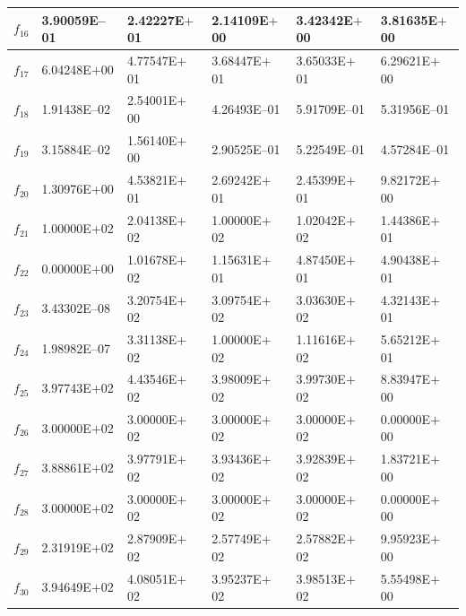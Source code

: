 \documentclass{svproc}
\begin{document}
\begin{table}
{\begin{tabular}{p{1cm}p{2.5cm}p{2.5cm}p{2.5cm}p{2.5cm}p{2.5cm}}
		$f_{16}$ & 3.90059E--01 & 2.42227E$+$01 & 2.14109E$+$00 & 3.42342E$+$00 & 3.81635E$+$00 \\ \hline
		$f_{17}$ & 6.04248E$+$00 & 4.77547E$+$01 & 3.68447E$+$01 & 3.65033E$+$01 & 6.29621E$+$00 \\ \hline
		$f_{18}$ & 1.91438E--02 & 2.54001E$+$00 & 4.26493E--01 & 5.91709E--01 & 5.31956E--01 \\ \hline
		$f_{19}$ & 3.15884E--02 & 1.56140E$+$00 & 2.90525E--01 & 5.22549E--01 & 4.57284E--01 \\ \hline
		$f_{20}$ & 1.30976E$+$00 & 4.53821E$+$01 & 2.69242E$+$01 & 2.45399E$+$01 & 9.82172E$+$00 \\ \hline
		$f_{21}$ & 1.00000E$+$02 & 2.04138E$+$02 & 1.00000E$+$02 & 1.02042E$+$02 & 1.44386E$+$01 \\ \hline
		$f_{22}$ & 0.00000E$+$00 & 1.01678E$+$02 & 1.15631E$+$01 & 4.87450E$+$01 & 4.90438E$+$01 \\ \hline
		$f_{23}$ & 3.43302E--08 & 3.20754E$+$02 & 3.09754E$+$02 & 3.03630E$+$02 & 4.32143E$+$01 \\ \hline
		$f_{24}$ & 1.98982E--07 & 3.31138E$+$02 & 1.00000E$+$02 & 1.11616E$+$02 & 5.65212E$+$01 \\ \hline
		$f_{25}$ & 3.97743E$+$02 & 4.43546E$+$02 & 3.98009E$+$02 & 3.99730E$+$02 & 8.83947E$+$00 \\ \hline
		$f_{26}$ & 3.00000E$+$02 & 3.00000E$+$02 & 3.00000E$+$02 & 3.00000E$+$02 & 0.00000E$+$00 \\ \hline
		$f_{27}$ & 3.88861E$+$02 & 3.97791E$+$02 & 3.93436E$+$02 & 3.92839E$+$02 & 1.83721E$+$00 \\ \hline
		$f_{28}$ & 3.00000E$+$02 & 3.00000E$+$02 & 3.00000E$+$02 & 3.00000E$+$02 & 0.00000E$+$00 \\ \hline
		$f_{29}$ & 2.31919E$+$02 & 2.87909E$+$02 & 2.57749E$+$02 & 2.57882E$+$02 & 9.95923E$+$00 \\ \hline
		$f_{30}$ & 3.94649E$+$02 & 4.08051E$+$02 & 3.95237E$+$02 & 3.98513E$+$02 & 5.55498E$+$00 \\ \hline
	\end{tabular}
}
\end{table}
\end{document}
